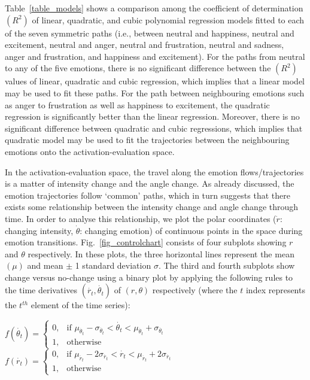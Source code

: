 \documentclass[10pt,journal,cspaper,compsoc]{IEEEtran}
\begin{document}
Table~\ref{table_models} shows a comparison among the coefficient of determination $(R^{2})$ of linear, quadratic, and cubic polynomial regression models fitted to each of the seven symmetric paths (i.e., between neutral and happiness, neutral and excitement, neutral and anger, neutral and frustration, neutral and sadness, anger and frustration, and happiness and excitement). For the paths from neutral to any of the five emotions, there is no significant difference between the $(R^{2})$ values of linear, quadratic and cubic regression, which implies that a linear model may be used to fit these paths. For the path between neighbouring emotions such as anger to frustration as well as happiness to excitement, the quadratic regression is significantly better than the linear regression. Moreover, there is no significant difference between quadratic and cubic regressions, which implies that quadratic model may be used to fit the trajectories between the neighbouring emotions onto the activation-evaluation space.




In the activation-evaluation space, the travel along the emotion flows/trajectories is a matter of intensity change and the angle change. As already discussed, the emotion trajectories follow `common' paths, which in turn suggests that there exists some relationship between the intensity change and angle change through time. In order to analyse this relationship, we plot the polar coordinates ($\dot{r}$: changing intensity, $\dot{\theta}$: changing emotion) of continuous points in the space during emotion transitions. Fig.~\ref{fig_controlchart} consists of four subplots showing $r$ and $\theta$ respectively. In these plots, the three horizontal lines represent the mean $(\mu)$ and mean $\pm$ 1 standard deviation $\sigma$. The third and fourth subplots show change versus no-change using a binary plot by applying the following rules to the time derivatives $(\dot{r_{t}},\dot{\theta_{t}})$ of $(r,\theta)$ respectively (where the $t$ index represents the $t^{th}$ element of the time series):

\begin{center}
$f(\dot{\theta_{t}}) = \left\{ \begin{array}{ll}
0, 	&	 \text{if } \mu_{\dot{\theta_{t}}}-\sigma_{\dot{\theta_{t}}}<\dot{\theta_{t}}<\mu_{\dot{\theta_{t}}}+\sigma_{\dot{\theta_{t}}} \\ 
1, 	&	 \text{otherwise}
\end{array}\right.$ \\
$f(\dot{r_{t}}) = \left\{ \begin{array}{ll}
0, 	&	 \text{if } \mu_{\dot{r_{t}}}-2\sigma_{\dot{r_{t}}}<\dot{r_{t}}<\mu_{\dot{r_{t}}}+2\sigma_{\dot{r_{t}}} \\ 
1, 	&	 \text{otherwise}
\end{array}\right.$
\end{center}
\end{document}
